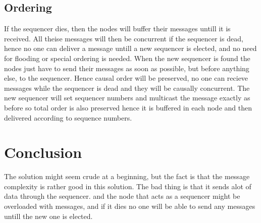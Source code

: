 \documentclass{article}
\begin{document}
  \subsection{Ordering}
    If the sequencer dies, then the nodes will buffer their messages untill it is received. 
    All theise messages will then be concurrent if the sequencer is dead, hence no one can 
    deliver a message untill a new sequencer is elected, and no need for flooding or special
    ordering is needed. When the new sequencer is found the nodes just have to send their messages as soon
    as possible, but before anything else, to the sequencer. Hence causal order will be preserved, no one
    can recieve messages while the sequencer is dead and they will be causally concurrent. The new sequencer
    will set sequencer numbers and multicast the message exactly as before so total order is also preserved
    hence it is buffered in each node and then delivered according to sequence numbers.
    
\section{Conclusion}
  The solution might seem crude at a beginning, but the fact is that the message complexity
  is rather good in this solution. The bad thing is that it sends alot of data through the 
  sequencer. and the node that acts as a sequencer might be overloaded with messages, and if 
  it dies no one will be able to send any messages untill the new one is elected.
\end{document}
